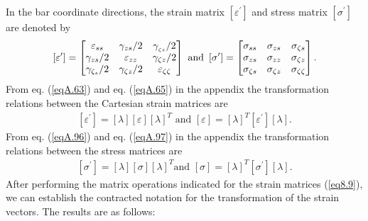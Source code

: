 \documentclass{AeroStructure-ERJohnson}
\begin{document}
In the bar coordinate directions, the strain matrix
$[\varepsilon^{\prime}]$ and stress matrix $[\sigma^{\prime}]$ are
denoted by
\begin{align}\label{eq8.8}
\left[\varepsilon^{\prime}\right]=\left[\begin{array}{@{}ccc@{}}
\varepsilon_{s s} & \gamma_{z s}/ 2 & \gamma_{_{\zeta s}}/ 2\\
\gamma_{z s}/ 2 & \varepsilon_{z z} & \gamma_{\zeta z}/ 2\\
\gamma_{\zeta_{s}}/ 2 & \gamma_{\zeta z}/ 2 & \varepsilon_{\zeta
\zeta} \end{array}\right] \mbox{ and }
\left[\sigma^{\prime}\right]=\left[\begin{array}{@{}ccc@{}}
\sigma_{s s} & \sigma_{z s} & \sigma_{\zeta s}\\
\sigma_{z s} &
\sigma_{z z} & \sigma_{\zeta z}\\
\sigma_{\zeta s} &
\sigma_{\zeta z} & \sigma_{\zeta \zeta} \end{array}\right].
\end{align}
From eq. (\ref{eqA.63}) and eq. (\ref{eqA.65}) in the appendix the
transformation relations between the Cartesian strain matrices are
\begin{align}\label{eq8.9}
\left[\varepsilon^{\prime}\right]=[\lambda][\varepsilon][\lambda]^{T}
\mbox{ and }
[\varepsilon]=[\lambda]^{T}\left[\varepsilon^{\prime}\right][\lambda].
\end{align}
From eq. (\ref{eqA.96}) and eq. (\ref{eqA.97}) in the appendix the
transformation relations between the stress matrices are
\begin{align}\label{eq8.10}
\left[\sigma^{\prime}\right]=[\lambda][\sigma][\lambda]^{T}\mbox{
and } [\sigma]=[\lambda]^{T}\left[\sigma^{\prime}\right][\lambda].
\end{align}
After performing the matrix operations indicated for the strain
matrices (\ref{eq8.9}), we can establish the contracted notation
for the transformation of the strain vectors. The results are as
follows:
\end{document}

